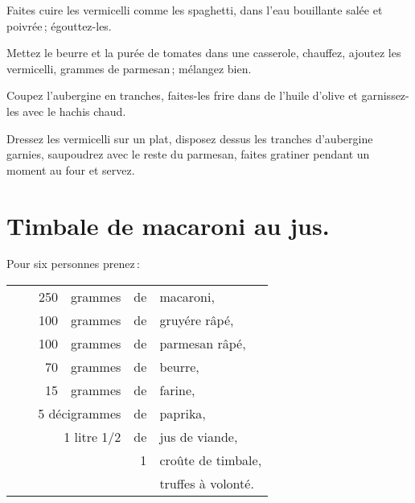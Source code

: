 Faites cuire les vermicelli comme les spaghetti, dans l'eau bouillante salée et
poivrée ; égouttez-les.

Mettez le beurre et la purée de tomates dans une casserole, chauffez, ajoutez
les vermicelli, {\mmm} grammes de parmesan ; mélangez bien.

Coupez l'aubergine en tranches, faites-les frire dans de l'huile d'olive et
garnissez-les avec le hachis chaud.

Dressez les vermicelli sur un plat, disposez dessus les tranches d'aubergine
garnies, saupoudrez avec le reste du parmesan, faites gratiner pendant un
moment au four et servez.

\section*{\centering Timbale de macaroni au jus.}
{}

Pour six personnes prenez :

\footnotesize
\begin{longtable}{rrrrrp{18em}}
  & \hspace{2em} & 250 & grammes  & de & macaroni,                                                        \\
  & \hspace{2em} & 100 & grammes  & de & gruyére râpé,                                                    \\
  & \hspace{2em} & 100 & grammes  & de & parmesan râpé,                                                   \\
  & \hspace{2em} &  70 & grammes  & de & beurre,                                                          \\
  & \hspace{2em} &  15 & grammes  & de & farine,                                                          \\
  & \multicolumn{3}{r}{5 décigrammes}  & de & paprika,                                                    \\
  & \multicolumn{3}{r}{1 litre 1/2}    & de & jus de viande,                                              \\
  & \hspace{2em} &     &          &  1 & croûte de timbale,                                               \\
  & \hspace{2em} &     &          &    & truffes à volonté.                                               \\
\end{longtable}
\normalsize

